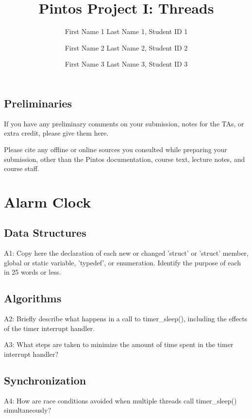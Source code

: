 \documentclass[journal]{IEEEtran}
\begin{document}
\title{\LARGE{Pintos Project I: Threads}}

\author{First Name 1 Last Name 1, Student ID 1 \\\and 
        First Name 2 Last Name 2, Student ID 2 \\\and 
        First Name 3 Last Name 3, Student ID 3} 


\maketitle
\subsection{Preliminaries}
If you have any preliminary comments on your submission, notes for the TAs, or extra credit, please give them here.

Please cite any offline or online sources you consulted while preparing your submission, other than the Pintos documentation, course text, lecture notes, and course staff.
\section{Alarm Clock}
\subsection{Data Structures}
A1: Copy here the declaration of each new or changed 'struct' or 'struct' member, global or static variable, 'typedef', or enumeration.  Identify the purpose of each in 25 words or less.
\subsection{Algorithms}
A2: Briefly describe what happens in a call to timer\_sleep(), including the effects of the timer interrupt handler.

A3: What steps are taken to minimize the amount of time spent in the timer interrupt handler?
\subsection{Synchronization}
A4: How are race conditions avoided when multiple threads call timer\_sleep() simultaneously?
\end{document}
